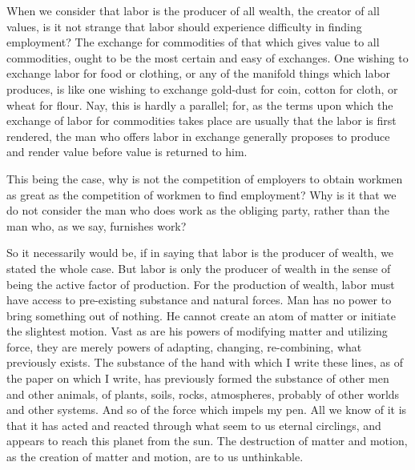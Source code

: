 \documentclass{book}
\begin{document}
When we consider that labor is the producer of all wealth, the creator of all values, is it not strange that labor should experience difficulty in finding employment? The exchange for commodities of that which gives value to all commodities, ought to be the most certain and easy of exchanges. One wishing to exchange labor for food or clothing, or any of the manifold things which labor produces, is like one wishing to exchange gold-dust for coin, cotton for cloth, or wheat for flour. Nay, this is hardly a parallel; for, as the terms upon which the exchange of labor for commodities takes place are usually that the labor is first rendered, the man who offers labor in exchange generally proposes to produce and render value before value is returned to him.

This being the case, why is not the competition of employers to obtain workmen as great as the competition of workmen to find employment? Why is it that we do not consider the man who does work as the obliging party, rather than the man who, as we say, furnishes work?

So it necessarily would be, if in saying that labor is the producer of wealth, we stated the whole case. But labor is only the producer of wealth in the sense of being the active factor of production. For the production of wealth, labor must have access to pre-existing substance and natural forces. Man has no power to bring something out of nothing. He cannot create an atom of matter or initiate the slightest motion. Vast as are his powers of modifying matter and utilizing force, they are merely powers of adapting, changing, re-combining, what previously exists. The substance of the hand with which I write these lines, as of the paper on which I write, has previously formed the substance of other men and other animals, of plants, soils, rocks, atmospheres, probably of other worlds and other systems. And so of the force which impels my pen. All we know of it is that it has acted and reacted through what seem to us eternal circlings, and appears to reach this planet from the sun. The destruction of matter and motion, as the creation of matter and motion, are to us unthinkable.
\end{document}
